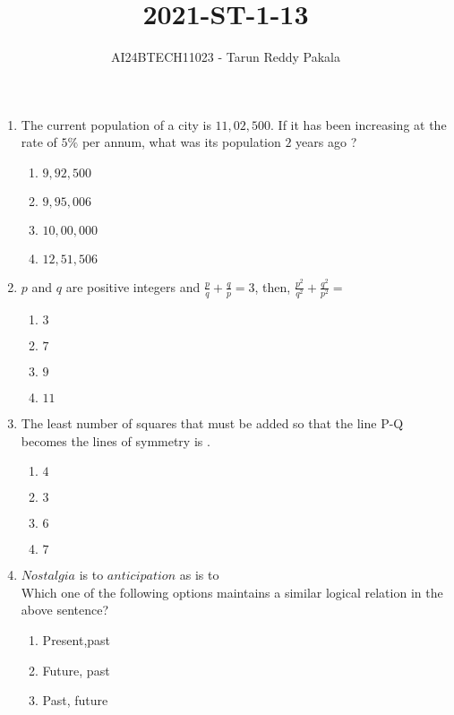 \documentclass[journal,12pt,onecolumn]{IEEEtran}
\title{2021-ST-1-13}
\author{AI24BTECH11023 - Tarun Reddy Pakala}
\theoremstyle{remark}
\begin{document}


\maketitle
\bigskip
\renewcommand{\thefigure}{\theenumi}
\renewcommand{\thetable}{\theenumi}
\begin{enumerate}
\item The current population of a city is $11,02,500$. If it has been increasing at the rate of $5\%$ per annum, what was its population $2$ years ago ?
\begin{enumerate}
    \item $9,92,500$
    \item $9,95,006$
    \item $10,00,000$
    \item $12,51,506$
\end{enumerate}
\item $p$ and $q$ are positive integers and $\frac{p}{q}+\frac{q}{p}=3$, then, $\frac{p^2}{q^2}+\frac{q^2}{p^2}=$
\begin{enumerate}
    \item $3$
    \item $7$
    \item $9$
    \item $11$
\end{enumerate}
\item The least number of squares that must be added so that the line P-Q becomes the lines of symmetry is \underline{\hspace{2cm}}.

\begin{enumerate}
    \item $4$
    \item $3$
    \item $6$
    \item $7$
\end{enumerate}
\item $Nostalgia$ is to $anticipation$ as \underline{\hspace{2cm}} is to \underline{\hspace{2cm}}\\ Which one of the following options maintains a similar logical relation in the above sentence?
\begin{enumerate}
    \item Present,past 
    \item Future, past
    \item Past, future

\end{enumerate}
\end{enumerate}
\end{document}
